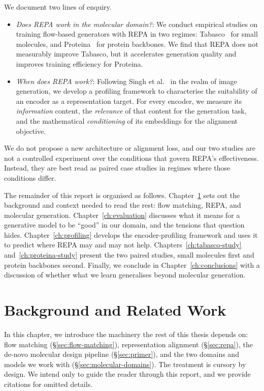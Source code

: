 \documentclass[12pt,a4paper,twoside]{report}
\begin{document}
We document two lines of enquiry.
\begin{itemize}
  \item[(i)] \emph{Does REPA work in the molecular domain?}: We conduct empirical studies on training flow-based generators with REPA in two regimes: Tabasco~\cite{Tabasco} for small molecules, and Proteina~\cite{Proteina} for protein backbones. We find that REPA does not measurably improve Tabasco, but it accelerates generation quality and improves training efficiency for Proteina.
  \item[(ii)] \emph{When does REPA work?}: Following Singh et al.~\cite{SpatialStructure} in the realm of image generation, we develop a profiling framework to characterise the suitability of an encoder as a representation target. For every encoder, we measure its \emph{information} content, the \emph{relevance} of that content for the generation task, and the mathematical \emph{conditioning} of its embeddings for the alignment objective.
\end{itemize}

We do not propose a new architecture or alignment loss, and our two studies are not a controlled experiment over the conditions that govern REPA's effectiveness. Instead, they are best read as paired case studies in regimes where those conditions differ.

The remainder of this report is organised as follows. Chapter~\ref{ch:background} sets out the background and context needed to read the rest: flow matching, REPA, and molecular generation. Chapter~\ref{ch:evaluation} discusses what it means for a generative model to be ``good'' in our domain, and the tensions that question hides. Chapter~\ref{ch:profiling} develops the encoder-profiling framework and uses it to predict where REPA may and may not help. Chapters~\ref{ch:tabasco-study} and~\ref{ch:proteina-study} present the two paired studies, small molecules first and protein backbones second. Finally, we conclude in Chapter~\ref{ch:conclusions} with a discussion of whether what we learn generalises beyond molecular generation.

\chapter{Background and Related Work}
\label{ch:background}



In this chapter, we introduce the machinery the rest of this thesis depends on: flow matching (\S\ref{sec:flow-matching}), representation alignment (\S\ref{sec:repa}), the de-novo molecular design pipeline (\S\ref{sec:primer}), and the two domains and models we work with (\S\ref{sec:molecular-domains}). The treatment is cursory by design. We intend only to guide the reader through this report, and we provide citations for omitted details.
\end{document}

